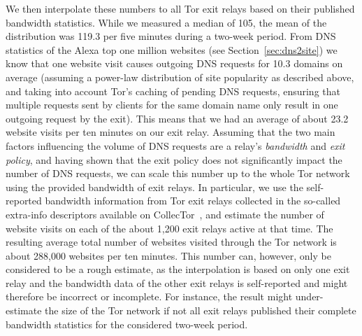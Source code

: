 We then interpolate these numbers to all Tor exit relays based on their
published bandwidth statistics.  While we measured a median of 105,
the mean of the distribution was 119.3 per five minutes during a two-week period.
From DNS statistics of the Alexa top one million websites (see
Section~\ref{sec:dns2site}) we know that one website visit causes outgoing DNS requests for 10.3 domains on average
(assuming a power-law distribution of site popularity as described above, and
taking into account Tor's caching of pending DNS requests, ensuring that multiple
requests sent by clients for the same domain name only result in one outgoing request
by the exit).
This means that we had an average of about 23.2 website visits per ten
minutes on our exit relay.  Assuming that the two main factors influencing the
volume of DNS requests are a relay's \emph{bandwidth} and \emph{exit policy},
and having shown that the exit policy does not significantly impact
the number of DNS requests, we can scale this number up to the whole Tor network
using the provided bandwidth of exit relays.  In particular, we use the
self-reported bandwidth information from Tor exit
relays collected in the so-called extra-info descriptors available on
CollecTor~\cite{collector}, and estimate the number of website visits on
each of the about 1,200 exit relays active at that time. The resulting average
total number of websites visited through the Tor network is about 288,000
websites per ten minutes. This number can, however, only be considered
to be a rough estimate, as the interpolation is based on only one exit
relay and the bandwidth data of the other exit relays is self-reported
and might therefore be incorrect or incomplete. For instance, the result
might under-estimate the size of the Tor network if not all exit relays
published their complete bandwidth statistics for the considered
two-week period.

